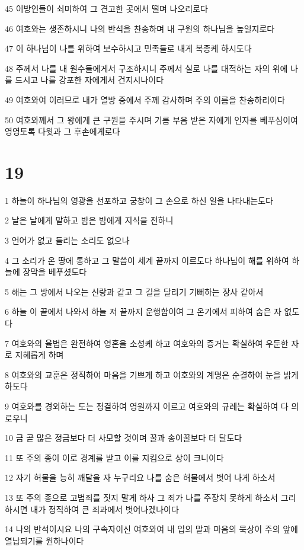 \par 45 이방인들이 쇠미하여 그 견고한 곳에서 떨며 나오리로다
\par 46 여호와는 생존하시니 나의 반석을 찬송하며 내 구원의 하나님을 높일지로다
\par 47 이 하나님이 나를 위하여 보수하시고 민족들로 내게 복종케 하시도다
\par 48 주께서 나를 내 원수들에게서 구조하시니 주께서 실로 나를 대적하는 자의 위에 나를 드시고 나를 강포한 자에게서 건지시나이다
\par 49 여호와여 이러므로 내가 열방 중에서 주께 감사하며 주의 이름을 찬송하리이다
\par 50 여호와께서 그 왕에게 큰 구원을 주시며 기름 부음 받은 자에게 인자를 베푸심이여 영영토록 다윗과 그 후손에게로다

\chapter{19}

\par 1 하늘이 하나님의 영광을 선포하고 궁창이 그 손으로 하신 일을 나타내는도다
\par 2 날은 날에게 말하고 밤은 밤에게 지식을 전하니
\par 3 언어가 없고 들리는 소리도 없으나
\par 4 그 소리가 온 땅에 통하고 그 말씀이 세계 끝까지 이르도다 하나님이 해를 위하여 하늘에 장막을 베푸셨도다
\par 5 해는 그 방에서 나오는 신랑과 같고 그 길을 달리기 기뻐하는 장사 같아서
\par 6 하늘 이 끝에서 나와서 하늘 저 끝까지 운행함이여 그 온기에서 피하여 숨은 자 없도다
\par 7 여호와의 율법은 완전하여 영혼을 소성케 하고 여호와의 증거는 확실하여 우둔한 자로 지혜롭게 하며
\par 8 여호와의 교훈은 정직하여 마음을 기쁘게 하고 여호와의 계명은 순결하여 눈을 밝게 하도다
\par 9 여호와를 경외하는 도는 정결하여 영원까지 이르고 여호와의 규례는 확실하여 다 의로우니
\par 10 금 곧 많은 정금보다 더 사모할 것이며 꿀과 송이꿀보다 더 달도다
\par 11 또 주의 종이 이로 경계를 받고 이를 지킴으로 상이 크니이다
\par 12 자기 허물을 능히 깨달을 자 누구리요 나를 숨은 허물에서 벗어 나게 하소서
\par 13 또 주의 종으로 고범죄를 짓지 말게 하사 그 죄가 나를 주장치 못하게 하소서 그리하시면 내가 정직하여 큰 죄과에서 벗어나겠나이다
\par 14 나의 반석이시요 나의 구속자이신 여호와여 내 입의 말과 마음의 묵상이 주의 앞에 열납되기를 원하나이다

